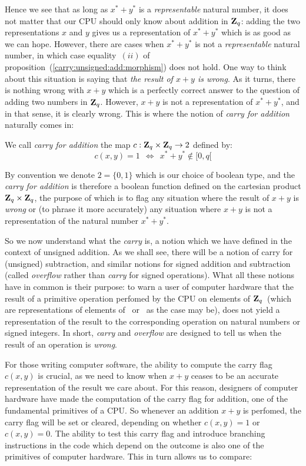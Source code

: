 \documentclass{article}
\newcommand{\zq}{\mbox{${\bf Z}_{q}$}}
\begin{document}
Hence we see that as long as $x^{*}+y^{*}$ is a {\em representable} natural
number, it does not matter that our CPU should only know about addition in \zq:
adding the two representations $x$ and $y$ gives us a representation of 
$x^{*}+y^{*}$ which is as good as we can hope. However, there are cases 
when $x^{*} + y^{*}$ is not a {\em representable} natural number, in which 
case equality~$(ii)$ of proposition~(\ref{carry:unsigned:add:morphism}) 
does not hold. One way to think about this situation is saying that 
{\em the result of $x+y$ is wrong}. As it turns, there is nothing wrong 
with $x+y$ which is a perfectly correct answer to the question of adding 
two numbers in \zq. However, $x+y$ is not a representation of $x^{*}+y^{*}$, 
and in that sense, it is clearly wrong. This is where the notion of 
{\em carry for addition} naturally comes in:

\begin{defin}\label{carry:unsigned:add:carry}
We call {\em carry for addition} the map $c:\zq\times\zq\rightarrow2$ defined by:
  \[
    c(x,y) = 1  \ \ \Leftrightarrow\ \ x^{*} + y^{*} \not\in[0,q[
  \]
\end{defin}

By convention we denote $2=\{0,1\}$ which is our choice of boolean type, 
and the {\em carry for addition} is therefore a boolean function defined 
on the cartesian product $\zq\times\zq$, the purpose of which
is to flag any situation where the result of $x+y$ is {\em wrong} or (to
phrase it more accurately) any situation where $x+y$ is not a representation 
of the natural number $x^{*}+y^{*}$. 

So we now understand what the {\em carry} is, a notion which we have defined 
in the context of unsigned addition. As we shall see, there will be a notion 
of carry for (unsigned) subtraction, and similar notions for signed addition 
and subtraction (called {\em overflow} rather than {\em carry} for signed 
operations). What all these notions have in common is their purpose: 
to warn a user of computer hardware that the result of a primitive operation 
perfomed by the CPU on elements of \zq\ (which are representations of elements
of \N\ or \Z\ as the case may be), does not yield a representation of the result 
to the corresponding operation on natural numbers or signed integers. In short, 
{\em carry} and {\em overflow} are designed to tell us when the result of an
operation is {\em wrong}.

For those writing computer software, the ability to compute the carry flag 
$c(x,y)$ is crucial, as we need to know when $x+y$ ceases to be an accurate 
representation of the result we care about. For this reason, designers of
computer hardware have made the computation of the carry flag for addition, 
one of the fundamental primitives of a CPU. So whenever an addition $x+y$ is
perfomed, the carry flag will be set or cleared, depending on whether 
$c(x,y)=1$ or $c(x,y)=0$. The ability to test this carry flag and introduce
branching instructions in the code which depend on the outcome is also one
of the primitives of computer hardware. This in turn allows us to compare:
\end{document}
